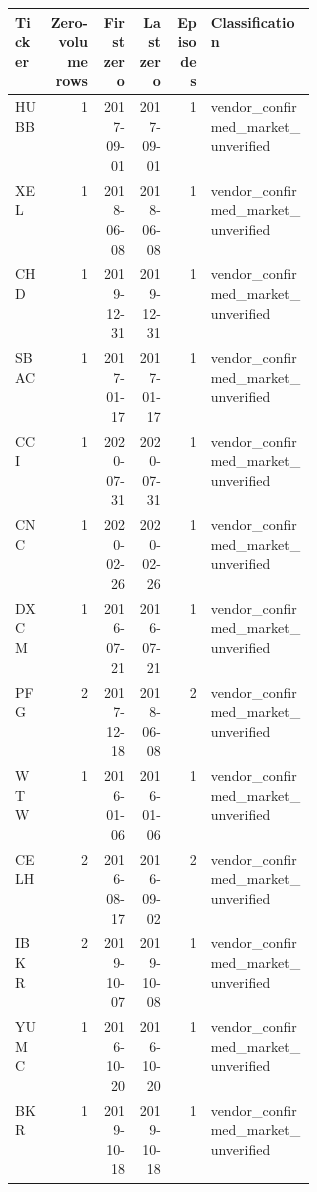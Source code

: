 \begin{tabular}{@{}lrrrrp{0.35\linewidth}@{}}
\toprule
Ticker & Zero-volume rows & First zero & Last zero & Episodes & Classification \\
\midrule
HUBB & 1 & 2017-09-01 & 2017-09-01 & 1 & vendor\_\allowbreak{}confirmed\_\allowbreak{}market\_\allowbreak{}unverified \\
XEL & 1 & 2018-06-08 & 2018-06-08 & 1 & vendor\_\allowbreak{}confirmed\_\allowbreak{}market\_\allowbreak{}unverified \\
CHD & 1 & 2019-12-31 & 2019-12-31 & 1 & vendor\_\allowbreak{}confirmed\_\allowbreak{}market\_\allowbreak{}unverified \\
SBAC & 1 & 2017-01-17 & 2017-01-17 & 1 & vendor\_\allowbreak{}confirmed\_\allowbreak{}market\_\allowbreak{}unverified \\
CCI & 1 & 2020-07-31 & 2020-07-31 & 1 & vendor\_\allowbreak{}confirmed\_\allowbreak{}market\_\allowbreak{}unverified \\
CNC & 1 & 2020-02-26 & 2020-02-26 & 1 & vendor\_\allowbreak{}confirmed\_\allowbreak{}market\_\allowbreak{}unverified \\
DXCM & 1 & 2016-07-21 & 2016-07-21 & 1 & vendor\_\allowbreak{}confirmed\_\allowbreak{}market\_\allowbreak{}unverified \\
PFG & 2 & 2017-12-18 & 2018-06-08 & 2 & vendor\_\allowbreak{}confirmed\_\allowbreak{}market\_\allowbreak{}unverified \\
WTW & 1 & 2016-01-06 & 2016-01-06 & 1 & vendor\_\allowbreak{}confirmed\_\allowbreak{}market\_\allowbreak{}unverified \\
CELH & 2 & 2016-08-17 & 2016-09-02 & 2 & vendor\_\allowbreak{}confirmed\_\allowbreak{}market\_\allowbreak{}unverified \\
IBKR & 2 & 2019-10-07 & 2019-10-08 & 1 & vendor\_\allowbreak{}confirmed\_\allowbreak{}market\_\allowbreak{}unverified \\
YUMC & 1 & 2016-10-20 & 2016-10-20 & 1 & vendor\_\allowbreak{}confirmed\_\allowbreak{}market\_\allowbreak{}unverified \\
BKR & 1 & 2019-10-18 & 2019-10-18 & 1 & vendor\_\allowbreak{}confirmed\_\allowbreak{}market\_\allowbreak{}unverified \\
\bottomrule
\end{tabular}
